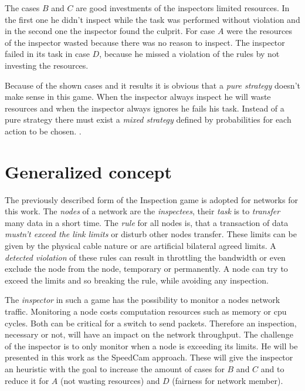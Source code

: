 \documentclass[thesis.tex]{subfiles}
\begin{document}
The cases $B$ and $C$ are good investments of the inspectors limited resources. In the first one he didn't inspect while the task was performed without violation and in the second one the inspector found the culprit. For case $A$ were the resources of the inspector wasted because there was no reason to inspect. The inspector failed in its task in case $D$, because he missed a violation of the rules by not investing the resources.

Because of the shown cases and it results it is obvious that a \textit{pure strategy} doesn't make sense in this game. When the inspector always inspect he will waste resources and when the inspector always ignores he fails his task. Instead of a pure strategy there must exist a \textit{mixed strategy} defined by probabilities for each action to be chosen. .


\section {Generalized concept} \label{sec:main:generalconcept}
The previously described form of the Inspection game is adopted for networks for this work. The \textit{nodes} of a network are the \textit{inspectees}, their \textit{task} is to \textit{transfer} many data in a short time. The \textit{rule} for all nodes is, that a transaction of data \textit{mustn't exceed the link limits} or disturb other nodes transfer. These limits can be given by the physical cable nature or are artificial bilateral agreed limits. A \textit{detected violation} of these rules can result in throttling the bandwidth or even exclude the node from the node, temporary or permanently. A node can try to exceed the limits and so breaking the rule, while avoiding any inspection. 

The \textit{inspector} in such a game has the possibility to monitor a nodes network traffic. Monitoring a node costs computation resources such as memory or cpu cycles. Both can be critical for a switch to send packets. Therefore an inspection, necessary or not, will have an impact on the network throughput. The challenge of the inspector is to only monitor when a node is exceeding its limits. He will be presented in this work as the SpeedCam approach. These will give the inspector an heuristic with the goal to increase the amount of cases for $B$ and $C$ and to reduce it for $A$ (not wasting resources) and $D$ (fairness for network member).
\end{document}
